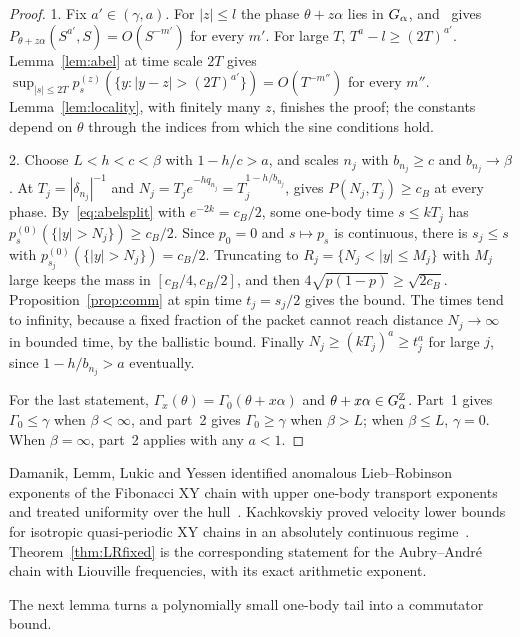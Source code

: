 \begin{proof}
1. Fix $a'\in(\gamma,a)$. For $|z|\le l$ the phase $\theta+z\alpha$ lies in $G_\alpha$, and~\cite[Theorem~A]{DMamo} gives $P_{\theta+z\alpha}(S^{a'},S)=O(S^{-m'})$ for every $m'$. For large $T$, $T^a-l\ge(2T)^{a'}$. Lemma~\ref{lem:abel} at time scale $2T$ gives $\sup_{|s|\le2T}p^{(z)}_s(\{y:|y-z|>(2T)^{a'}\})=O(T^{-m''})$ for every $m''$. Lemma~\ref{lem:locality}, with finitely many $z$, finishes the proof; the constants depend on $\theta$ through the indices from which the sine conditions hold.

2. Choose $L<h<c<\beta$ with $1-h/c>a$, and scales $n_j$ with $b_{n_j}\ge c$ and $b_{n_j}\to\beta$. At $T_j=|\delta_{n_j}|^{-1}$ and $N_j=T_je^{-hq_{n_j}}=T_j^{1-h/b_{n_j}}$, \cite[Theorem~B]{DMamo} gives $P(N_j,T_j)\ge c_B$ at every phase. By~\eqref{eq:abelsplit} with $e^{-2k}=c_B/2$, some one-body time $s\le kT_j$ has $p^{(0)}_s(\{|y|>N_j\})\ge c_B/2$. Since $p_0=0$ and $s\mapsto p_s$ is continuous, there is $s_j\le s$ with $p^{(0)}_{s_j}(\{|y|>N_j\})=c_B/2$. Truncating to $R_j=\{N_j<|y|\le M_j\}$ with $M_j$ large keeps the mass in $[c_B/4,c_B/2]$, and then $4\sqrt{p(1-p)}\ge\sqrt{2c_B}$. Proposition~\ref{prop:comm} at spin time $t_j=s_j/2$ gives the bound. The times tend to infinity, because a fixed fraction of the packet cannot reach distance $N_j\to\infty$ in bounded time, by the ballistic bound. Finally $N_j\ge(kT_j)^a\ge t_j^a$ for large $j$, since $1-h/b_{n_j}>a$ eventually.

For the last statement, $\Gamma_x(\theta)=\Gamma_0(\theta+x\alpha)$ and $\theta+x\alpha\in G_\alpha^\mathbb Z$. Part~1 gives $\Gamma_0\le\gamma$ when $\beta<\infty$, and part~2 gives $\Gamma_0\ge\gamma$ when $\beta>L$; when $\beta\le L$, $\gamma=0$. When $\beta=\infty$, part~2 applies with any $a<1$.
\end{proof}

\begin{remark}\label{rem:LRprior}
Damanik, Lemm, Lukic and Yessen identified anomalous Lieb--Robinson exponents of the Fibonacci XY chain with upper one-body transport exponents and treated uniformity over the hull~\cite{DLLY2016}. Kachkovskiy proved velocity lower bounds for isotropic quasi-periodic XY chains in an absolutely continuous regime~\cite{Kachkovskiy2016}. Theorem~\ref{thm:LRfixed} is the corresponding statement for the Aubry--Andr\'e chain with Liouville frequencies, with its exact arithmetic exponent.
\end{remark}

The next lemma turns a polynomially small one-body tail into a commutator bound.

